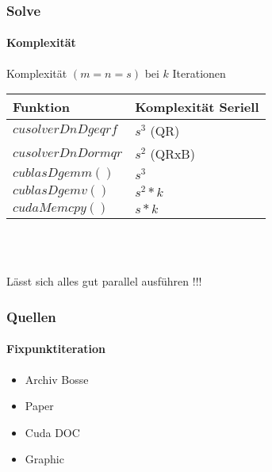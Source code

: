 \begin{frame}[fragile]
	\frametitle{Solve}
	\framesubtitle{Komplexität}
	Komplexität $(m=n=s)$ bei $k$ Iterationen\\
	\begin{center}
		\begin{tabular}{ l | l}
			Funktion & Komplexität Seriell \\
			\hline
			$cusolverDnDgeqrf$ & $s^3$ (QR) \\
			$cusolverDnDormqr$ & $s^2$ (QRxB) \\
			$cublasDgemm()$& $s^3$ \\
			$cublasDgemv()$ & $s^2 * k$  \\
			$cudaMemcpy()$ & $s * k$  \\
		\end{tabular} 	\\~\\
	\end{center}
	Lässt sich alles gut parallel ausführen !!!
\end{frame}
\begin{frame}
	\frametitle{Quellen}
	\framesubtitle{Fixpunktiteration}
	\begin{itemize}
		\item Archiv Bosse
		\item Paper
		\item Cuda DOC
		\item Graphic
	\end{itemize}
\end{frame}